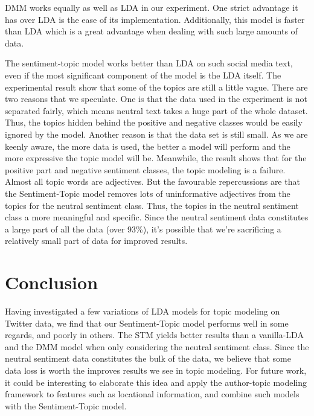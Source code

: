 \documentclass[12pt]{amsart}
\newcommand{\0}{\mat{0}}
\newcommand{\1}{\mathds{1}}
\begin{document}
DMM works equally as well as LDA in our experiment. One strict advantage it has over LDA is the ease of its implementation. Additionally, this model is faster than LDA which is a great advantage when dealing with such large amounts of data.

The sentiment-topic model works better than LDA on such social media text, even if the most significant component of the model is the LDA itself.  The experimental result show that some of the topics are still a little vague. There are two reasons that we speculate. One is that the data used in the experiment is not separated fairly, which means neutral text takes a huge part of the whole dataset. Thus, the topics hidden behind the positive and negative classes would be easily ignored by the model. Another reason is that the data set is still small. As we are keenly aware, the more data is used, the better a model will perform and the more expressive the topic model will be. Meanwhile, the result shows that for the positive part and negative sentiment classes, the topic modeling is a failure. Almost all topic words are adjectives. But the favourable repercussions are that the Sentiment-Topic model removes lots of uninformative adjectives from the topics for the neutral sentiment class. Thus, the topics in the neutral sentiment class a more meaningful and specific. Since the neutral sentiment data  constitutes a large part of all the data (over 93\%), it's possible that we're sacrificing a relatively small part of data for improved results.

\section{Conclusion}
Having investigated a few variations of LDA models for topic modeling on Twitter data, we find that our Sentiment-Topic model performs well in some regards, and poorly in others. The STM yields better results than a vanilla-LDA and the DMM model when only considering the neutral sentiment class. Since the neutral sentiment data constitutes the bulk of the data, we believe that some data loss is worth the improves results we see in topic modeling. For future work, it could be interesting to elaborate this idea and apply the author-topic modeling framework to features such as locational information, and combine such models with the Sentiment-Topic model.
\end{document}
